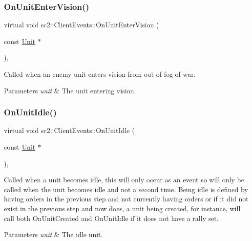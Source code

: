 \subsubsection{\texorpdfstring{On\+Unit\+Enter\+Vision()}{OnUnitEnterVision()}}
{\footnotesize\ttfamily virtual void sc2\+::\+Client\+Events\+::\+On\+Unit\+Enter\+Vision (\begin{DoxyParamCaption}\item[{const \hyperlink{classsc2_1_1_unit}{Unit} $\ast$}]{ }\end{DoxyParamCaption})\hspace{0.3cm}{\ttfamily [inline]}, {\ttfamily [virtual]}}

Called when an enemy unit enters vision from out of fog of war. 
\begin{DoxyParams}{Parameters}
{\em unit} & The unit entering vision. \\
\hline
\end{DoxyParams}
\mbox{\label{classsc2_1_1_client_events_adce0fc98fa9c3cc092a5a8b3f2feef45}} 
\subsubsection{\texorpdfstring{On\+Unit\+Idle()}{OnUnitIdle()}}
{\footnotesize\ttfamily virtual void sc2\+::\+Client\+Events\+::\+On\+Unit\+Idle (\begin{DoxyParamCaption}\item[{const \hyperlink{classsc2_1_1_unit}{Unit} $\ast$}]{ }\end{DoxyParamCaption})\hspace{0.3cm}{\ttfamily [inline]}, {\ttfamily [virtual]}}

Called when a unit becomes idle, this will only occur as an event so will only be called when the unit becomes idle and not a second time. Being idle is defined by having orders in the previous step and not currently having orders or if it did not exist in the previous step and now does, a unit being created, for instance, will call both On\+Unit\+Created and On\+Unit\+Idle if it does not have a rally set. 
\begin{DoxyParams}{Parameters}
{\em unit} & The idle unit. \\
\hline
\end{DoxyParams}
\mbox{\label{classsc2_1_1_client_events_a4cdc022420833b34fbcd1c9713096754}} 
